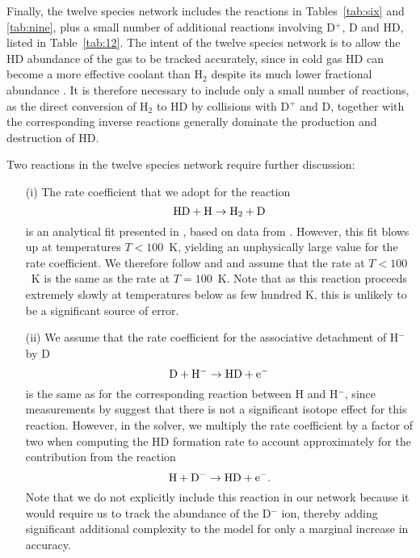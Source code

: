 Finally, the twelve species network includes the reactions in Tables~\ref{tab:six} and \ref{tab:nine}, plus a small number of additional reactions involving
D$^{+}$, D and HD, listed in Table~\ref{tab:12}. The intent of the twelve species network is to allow the HD abundance of the gas to be tracked accurately,
since in cold gas HD can become a more effective coolant than H$_{2}$ despite its much lower fractional abundance \citep[see e.g.][]{2006MNRAS.366..247J,2008ApJ...685....8M}. It is therefore necessary to include only a small number of reactions, as the direct conversion of H$_{2}$ to HD by collisions with D$^{+}$ and D, together with the
corresponding inverse reactions generally dominate the production and destruction of HD.

Two reactions in the twelve species network require further discussion:
\begin{enumerate}
\item[(i)] The rate coefficient that we adopt for the reaction
\begin{equation}
{\rm HD + H} \rightarrow {\rm H_{2} + D}
\end{equation}
is an analytical fit presented in \citet{2002P&SS...50.1197G}, based on data from \citet{1959JChPh..31.1359S}. However, this fit blows up
at temperatures $T < 100$~K, yielding an unphysically large value for the rate coefficient. We therefore follow \citet{2007MNRAS.376..709R}
and \citet{2008ApJ...685....8M} and assume that the rate at $T < 100$~K is the same as the rate at $T = 100$~K. Note that as this reaction
proceeds extremely slowly at temperatures below as few hundred K, this is unlikely to be a significant source of error. 
\item[(ii)] We assume that the rate coefficient for the associative detachment of H$^{-}$ by D
\begin{equation}
{\rm D + H^{-} \rightarrow  HD + e^{-}}
\end{equation}
is the same as for the corresponding reaction between H and H$^{-}$, since measurements by \citet{2012PhRvA..86c2714M} suggest that
there is not a significant isotope effect for this reaction. However, in the solver, we multiply the rate coefficient by a factor of two when
computing the HD formation rate to account approximately for the contribution from the reaction
\begin{equation}
{\rm H + D^{-} \rightarrow  HD + e^{-}}.
\end{equation}
Note that we do not explicitly include this reaction in our network because it would require us to track the abundance of the D$^{-}$ ion,
thereby adding significant additional complexity to the model for only a marginal increase in accuracy.
\end{enumerate}

